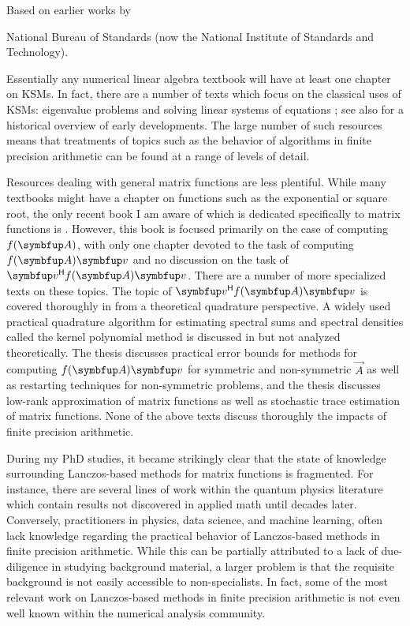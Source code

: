 Based on earlier works by 


National Bureau of Standards (now the National Institute of Standards and Technology).

\fi
Essentially any numerical linear algebra textbook will have at least one chapter on KSMs.
In fact, there are a number of texts which focus on the classical uses of KSMs: eigenvalue problems and solving linear systems of equations \cite{paige_71,greenbaum_97,saad_11,meurant_strakos_06,meurant_06,liesen_strakos_13}; see also \cite{golub_oleary_89} for a historical overview of early developments.
The large number of such resources means that treatments of topics such as the behavior of algorithms in finite precision arithmetic can be found at a range of levels of detail. 

Resources dealing with general matrix functions are less plentiful.
While many textbooks might have a chapter on functions such as the exponential or square root, the only recent book I am aware of which is dedicated specifically to matrix functions is \cite{higham_08}.
However, this book is focused primarily on the case of computing \( \fA \), with only one chapter devoted to the task of computing \( \fA \vec{v} \) and no discussion on the task of \( \vec{v}^\cT \fA \vec{v} \).
There are a number of more specialized texts on these topics.
The topic of \( \vec{v}^\cT \fA \vec{v} \) is covered thoroughly in \cite{golub_meurant_94,golub_meurant_09} from a theoretical quadrature perspective.
A widely used practical quadrature algorithm for estimating spectral sums and spectral densities called the kernel polynomial method is discussed in \cite{weisse_wellein_alvermann_fehske_06} but not analyzed theoretically.
The thesis \cite{schweitzer_16} discusses practical error bounds for methods for computing \( \fA\vec{v} \) for symmetric and non-symmetric \( \vec{A} \) as well as restarting techniques for non-symmetric problems, and the thesis \cite{cortinovis_22} discusses low-rank approximation of matrix functions as well as stochastic trace estimation of matrix functions.
None of the above texts discuss thoroughly the impacts of finite precision arithmetic.

During my PhD studies, it became strikingly clear that the state of knowledge surrounding Lanczos-based methods for matrix functions is fragmented.
For instance, there are several lines of work within the quantum physics literature which contain results not discovered in applied math until decades later.
Conversely, practitioners in physics, data science, and machine learning, often lack knowledge regarding the practical behavior of Lanczos-based methods in finite precision arithmetic. 
While this can be partially attributed to a lack of due-diligence in studying background material, a larger problem is that the requisite background is not easily accessible to non-specialists.
In fact, some of the most relevant work on Lanczos-based methods in finite precision arithmetic is not even well known within the numerical analysis community.


